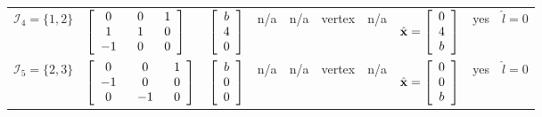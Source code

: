 \documentclass{imaman}
\newcommand{\bfx}{{\bf x}}
\newcommand{\calI}{{\mathcal I}}
\numberwithin{equation}{section}
\begin{document}
\begin{landscape}
\begin{table}[htbp]
\begin{threeparttable}[htbp]
\begin{tabular}{l l l l l l l l l l}
$\calI_4=\{1,2\}$ & \hspace{-0.1cm}$\left[ \renewcommand{\arraystretch}{1} \begin{array}{ccc} 0 & ~~0~~ & 1 \\ 1 & ~~1~~ & 0 \\ -1 & ~~0~~ & 0 \end{array}\right]$ & \hspace{-0.3cm}$\left[ \renewcommand{\arraystretch}{1} \begin{array}{c} b\\ 4\\ 0\end{array}\right]$ & \hspace{-0.15cm}n/a & \hspace{-0.2cm}n/a & \hspace{-0.1cm}vertex & \hspace{-0.1cm}n/a & \hspace{-0.1cm}$\hat\bfx=\left[ \renewcommand{\arraystretch}{1} \begin{array}{c} 0\\ 4\\ b\end{array}\right]$ & \hspace{-0.1cm}yes & \hspace{-0.1cm}$\hat l=0$ \vspace{0.1cm} \vspace{0.1cm} \\
$\calI_5=\{2,3\}$ & \hspace{-0.1cm}$\left[ \renewcommand{\arraystretch}{1} \begin{array}{ccc} 0 & ~~0~~ & 1 \\ -1 & ~~0~~ & 0 \\ 0 & ~~{-1}~~ & 0 \end{array}\right]$ & \hspace{-0.3cm}$\left[ \renewcommand{\arraystretch}{1} \begin{array}{c} b\\ 0\\ 0\end{array}\right]$ & \hspace{-0.15cm}n/a & \hspace{-0.2cm}n/a & \hspace{-0.1cm}vertex & \hspace{-0.1cm}n/a & \hspace{-0.1cm}$\hat\bfx=\left[ \renewcommand{\arraystretch}{1} \begin{array}{c} 0\\ 0\\ b\end{array}\right]$ & \hspace{-0.1cm}yes & \hspace{-0.1cm}$\hat l=0$ \vspace{0.1cm} \vspace{0.1cm} \\

\end{tabular}
\end{threeparttable}
\end{table}
\end{landscape}
\end{document}
